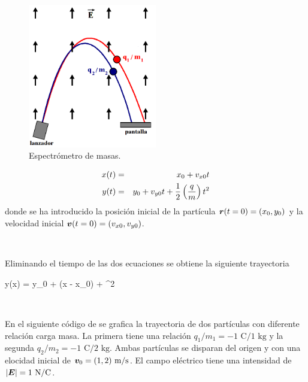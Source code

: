 \begin{figure}[htbp]
	\centering
	\includegraphics[width=0.50\textwidth]
	{./pictures/mass_spectrometer.png}

	\caption{\small{Espectrómetro de masas.}}
	
	\label{fig:mass_spectrometer}
\end{figure}


\begin{eqnarray}
\label{eq:x_equation}
x(t) &=& x_0 + v_{x0}t \\
\label{eq:y_equation}
y(t) &=& y_0 + v_{y0}t + \frac{1}{2}\left( \frac{q}{m} \right)t^2
\end{eqnarray}
donde se ha introducido la posición inicial de la partícula $\boldsymbol{ r }(t=0) = 
(x_0, y_0)$ y la velocidad inicial $\boldsymbol{ v }(t=0) = (v_{x0}, v_{y0})$.

\

Eliminando el tiempo de las dos ecuaciones se obtiene la siguiente 
trayectoria


{y(x) = y_0 + (x - x_0) + 
 ^2}

\

En el siguiente código de \python se grafica la trayectoria de dos 
partículas con diferente relación carga masa. La primera tiene una 
relación $q_1/m_1 = -1\mbox{ C}/1 \mbox{ kg}$ y la segunda $q_2/m_2 = 
-1\mbox{ C}/2 \mbox{ kg}$. Ambas partículas se disparan del origen y con 
una elocidad inicial de $\boldsymbol{ v }_0 = (1, 2) \mbox{ m/s}$. El campo eléctrico 
tiene una intensidad de $|\boldsymbol{ E }| = 1 \mbox{ N/C}$.

